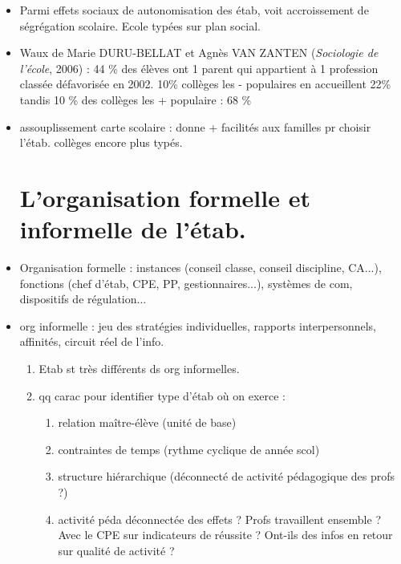 \documentclass[12pt]{report}
\begin{document}
\begin{itemize}
 \item Parmi effets sociaux de autonomisation des étab, voit accroissement de ségrégation scolaire. Ecole typées sur plan social. \\
 
 \item Waux de Marie DURU-BELLAT et Agnès VAN ZANTEN (\textit{Sociologie de l'école}, 2006) : 44 \% des élèves ont 1 parent qui appartient à 1 profession classée défavorisée en 2002. 10\% collèges les - populaires en accueillent  22\% tandis 10 \% des collèges les + populaire : 68 \% \\
 
 \item assouplissement carte scolaire : donne + facilités aux familles pr choisir l'étab. collèges encore plus typés.
 
 \section{L'organisation formelle et informelle de l'étab.}
 
 \item Organisation formelle : instances (conseil classe, conseil discipline, CA...), fonctions (chef d'étab, CPE, PP, gestionnaires...), systèmes de com, dispositifs de régulation... \\
 
 \item org informelle : jeu des stratégies individuelles, rapports interpersonnels, affinités, circuit réel de l'info.\\
 \begin{enumerate}
 \item Etab st très différents ds org informelles. \\
 \item qq carac pour identifier type d'étab où on exerce : \\
 \begin{enumerate}
 \item relation maître-élève (unité de base) \\
 \item contraintes de temps (rythme cyclique de année scol) \\
 \item structure hiérarchique (déconnecté de activité pédagogique des profs ?) \\
 \item activité péda déconnectée des effets ? Profs travaillent ensemble ? Avec le CPE sur indicateurs de réussite ? Ont-ils des infos en retour sur qualité de activité ? \\
 \end{enumerate}
 \end{enumerate}
 

\end{itemize}
\end{document}
